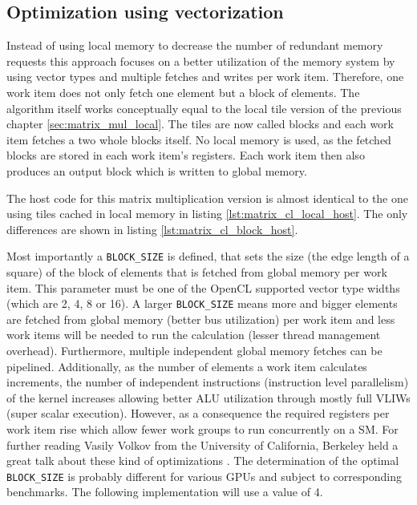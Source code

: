 \subsection{Optimization using vectorization}
Instead of using local memory to decrease the number of redundant memory requests this approach focuses on a better utilization of the memory system by using vector types and multiple fetches and writes per work item. Therefore, one work item does not only fetch one element but a block of elements.
The algorithm itself works conceptually equal to the local tile version of the previous chapter \ref{sec:matrix_mul_local}. The tiles are now called blocks and each work item fetches a two whole blocks itself. No local memory is used, as the fetched blocks are stored in each work item's registers. Each work item then also produces an output block which is written to global memory.

The host code for this matrix multiplication version is almost identical to the one using tiles cached in local memory in listing \ref{lst:matrix_cl_local_host}. The only differences are shown in listing \ref{lst:matrix_cl_block_host}.



Most importantly a \lstinline!BLOCK_SIZE! is defined, that sets the size (the edge length of a square) of the block of elements that is fetched from global memory per work item. This parameter must be one of the OpenCL supported vector type widths (which are 2, 4, 8 or 16). A larger \lstinline!BLOCK_SIZE! means more and bigger elements are fetched from global memory (better bus utilization) per work item and less work items will be needed to run the calculation (lesser thread management overhead). Furthermore, multiple independent global memory fetches can be pipelined. Additionally, as the number of elements a work item calculates increments, the number of independent instructions (instruction level parallelism) of the kernel increases allowing better ALU utilization through mostly full VLIWs (super scalar execution). However, as a consequence the required registers per work item rise which allow fewer work groups to run concurrently on a SM. For further reading Vasily Volkov from the University of California, Berkeley held a great talk about these kind of optimizations \cite{volkov}.
The determination of the optimal \lstinline!BLOCK_SIZE! is probably different for various GPUs and subject to corresponding benchmarks. The following implementation will use a value of 4.
 
